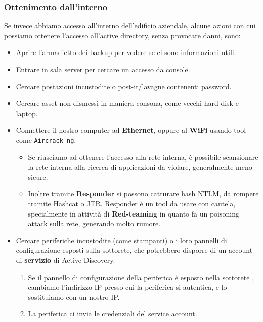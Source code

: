 \documentclass{article}
\begin{document}
\subsubsection{Ottenimento dall'interno}
Se invece abbiamo accesso all'interno dell'edificio aziendale, alcune azioni con cui possiamo ottenere l'accesso all'active directory, senza provocare danni, sono:
\begin{itemize}
	\item Aprire l’armadietto dei backup per vedere se ci sono informazioni utili.
	\item Entrare in sala server per cercare un accesso da console.
	\item Cercare postazioni incustodite o post-it/lavagne contenenti password.
	\item Cercare asset non dismessi in maniera consona, come vecchi hard disk e laptop.
	
	\item Connettere il nostro computer ad \textbf{Ethernet}, oppure al \textbf{WiFi} usando tool come \verb|Aircrack-ng|.
	\begin{itemize}
		\item Se riusciamo ad ottenere l'accesso alla rete interna, è possibile scansionare la rete interna alla ricerca di applicazioni da violare, generalmente meno sicure.
		
		\item Inoltre tramite \textbf{Responder} si possono catturare hash NTLM, da rompere tramite Hashcat o JTR. Responder è un tool da usare con cautela, specialmente in attività di \textbf{Red-teaming} in quanto fa un poisoning attack sulla rete, generando molto rumore. 
	\end{itemize}
	
	\item Cercare periferiche incustodite (come stampanti) o i loro pannelli di configurazione esposti sulla sottorete, che potrebbero disporre di un account di \textbf{servizio} di Active Discovery.
	\begin{enumerate}
		\item Se il pannello di configurazione della periferica è esposto nella sottorete , cambiamo l’indirizzo IP presso cui la periferica si autentica, e lo sostituiamo con un nostro IP.
		
		\item La periferica ci invia le credenziali del service account.
	\end{enumerate}
\end{itemize}
\end{document}
